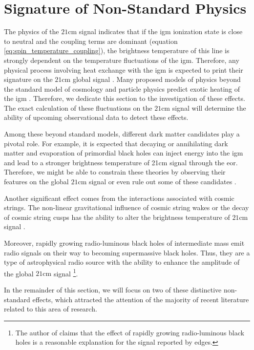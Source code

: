 \documentclass[12pt, TexShade, letterpaper]{report}
\begin{document}
\section{Signature of Non-Standard Physics}
\label{chap:global21cm,sub:non_standard}
The physics of the $\mathrm{21cm}$ signal indicates that if the \gls{igm} ionization state is close to neutral and the coupling terms are dominant (equation \ref{eq:spin_temperature_coupling}), the brightness temperature of this line is strongly dependent on the temperature fluctuations of the \gls{igm}. Therefore, any physical process involving heat exchange with the \gls{igm} is expected to print their signature on the $\mathrm{21cm}$ global signal \cite{21century}. Many proposed models of physics beyond the standard model of cosmology and particle physics predict exotic heating of the 
\gls{igm} \cite{21century}. Therefore, we dedicate this section to the investigation of these effects. The exact calculation of these fluctuations on the $\mathrm{21cm}$ signal will determine the ability of upcoming observational data to detect these effects.\par
Among these beyond standard models, different dark matter candidates play a pivotal role. For example, it is expected that decaying or annihilating dark matter and evaporation of primordial black holes can inject energy into the \gls{igm} and lead to a stronger brightness temperature of 21cm signal through the \gls{eor}. Therefore, we might be able to constrain these theories by observing their features on the global $\mathrm{21cm}$ signal \cite{primordial_bh, new_physics_thesis, primordial_bh_binary, 21limit_dm_bh, bound_dm} or even rule out some of these candidates \cite{rule_out}.\par
Another significant effect comes from the interactions associated with cosmic strings. The non-linear gravitational influence of cosmic string wakes or the decay of cosmic string cusps has the ability to alter the brightness temperature of $\mathrm{21cm}$ signal \cite{WF_effect_oscar, cosmic_string_oscar, string_loop_robert}. \par
Moreover, rapidly growing radio-luminous black holes of intermediate mass emit radio signals on their way to becoming supermassive black holes. Thus, they are a type of astrophysical radio source with the ability to enhance the amplitude of the global $\mathrm{21cm}$ signal \cite{bh_cosmioc_dawn} \footnote{The author of \cite{bh_cosmioc_dawn} claims that the effect of rapidly growing radio-luminous black holes is a reasonable explanation for the signal reported by \gls{edges}.}. \par
In the remainder of this section, we will focus on two of these distinctive non-standard effects, which attracted the attention of the majority of recent literature related to this area of research.\par
\end{document}
